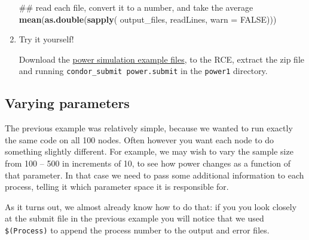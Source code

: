 \documentclass[]{book}
\newenvironment{Shaded}{\begin{snugshade}}{\end{snugshade}}
\newcommand{\KeywordTok}[1]{\textcolor[rgb]{0.13,0.29,0.53}{\textbf{#1}}}
\newcommand{\DataTypeTok}[1]{\textcolor[rgb]{0.13,0.29,0.53}{#1}}
\newcommand{\OtherTok}[1]{\textcolor[rgb]{0.56,0.35,0.01}{#1}}
\newcommand{\NormalTok}[1]{#1}
\begin{document}
\begin{enumerate}
\begin{Shaded}
\begin{Highlighting}[]
\NormalTok{## read each file, convert it to a number, and take the average}
\KeywordTok{mean}\NormalTok{(}\KeywordTok{as.double}\NormalTok{(}\KeywordTok{sapply}\NormalTok{(}
\NormalTok{                      output_files,}
\NormalTok{                      readLines,}
                      \DataTypeTok{warn =} \OtherTok{FALSE}\NormalTok{)))}
\end{Highlighting}
\end{Shaded}
\item
  Try it yourself!

  Download the \href{examples_R/power1.zip}{power simulation example
  files}, to the RCE, extract the zip file and running
  \texttt{condor\_submit\ power.submit} in the \texttt{power1}
  directory.
\end{enumerate}

\subsection{Varying parameters}\label{varying-parameters}

The previous example was relatively simple, because we wanted to run
exactly the same code on all 100 nodes. Often however you want each node
to do something slightly different. For example, we may wish to vary the
sample size from 100 -- 500 in increments of 10, to see how power
changes as a function of that parameter. In that case we need to pass
some additional information to each process, telling it which parameter
space it is responsible for.

As it turns out, we almost already know how to do that: if you you look
closely at the submit file in the previous example you will notice that
we used \texttt{\$(Process)} to append the process number to the output
and error files.
\end{document}
